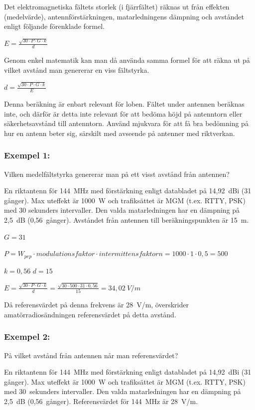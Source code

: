 Det elektromagnetiska fältets storlek (i fjärrfältet) räknas ut från
effekten (medelvärde), antennförstärkningen, matarledningens dämpning
och avståndet enligt följande förenklade formel.

\(E=\frac{\sqrt{30 \cdot P \cdot G \cdot k}}{d}\)

Genom enkel matematik kan man då använda samma formel för att räkna
ut på vilket avstånd man genererar en viss fältstyrka.

\(d=\frac{\sqrt{30 \cdot P \cdot G \cdot k}}{E}\)

Denna beräkning är enbart relevant för loben. Fältet under antennen
beräknas inte, och därför är detta inte relevant för att bedöma höjd
på antenntorn eller säkerhetsavstånd till antenntorn. Använd mjukvara för
att få bra bedömning på hur en antenn beter sig, särskilt med avseende på
antenner med riktverkan.

\subsubsection{Exempel 1:}

Vilken medelfältstyrka genererar man på ett visst avstånd från antennen?

En riktantenn för 144~MHz med förstärkning enligt databladet på
14,92~dBi (31 gånger).
Max uteffekt är 1000~W och trafiksättet är MGM (t.ex. RTTY, PSK) med
30 sekunders intervaller.
Den valda matarledningen har en dämpning på 2,5~dB (0,56~gånger).
Avståndet från antennen till beräkningspunkten är 15~m.

\(G = 31\)

\(P = W_{pep} \cdot modulationsfaktor \cdot intermittensfaktorn
= 1000 \cdot 1 \cdot 0,5 = 500\)

\(k = 0,56\)
\(d = 15\)

\(E = \frac{\sqrt{30 \cdot P \cdot G \cdot k}}{d}
= \frac{\sqrt{30 \cdot 500 \cdot 31 \cdot 0,56}}{15}
= 34,02\ V/m\)

Då referensvärdet på denna frekvens är 28~V/m, överskrider
amatörradiosändningen referensvärdet på detta avstånd.

\subsubsection{Exempel 2:}

På vilket avstånd från antennen når man referensvärdet?

En riktantenn för 144~MHz med förstärkning enligt databladet på
14,92~dBi (31 gånger).
Max uteffekt är 1000~W och trafiksättet är MGM (t.ex. RTTY, PSK) med
30~sekunders intervaller.
Den valda matarledningen har en dämpning på 2,5~dB (0,56~gånger).
Referensvärdet för 144~MHz är 28~V/m.

